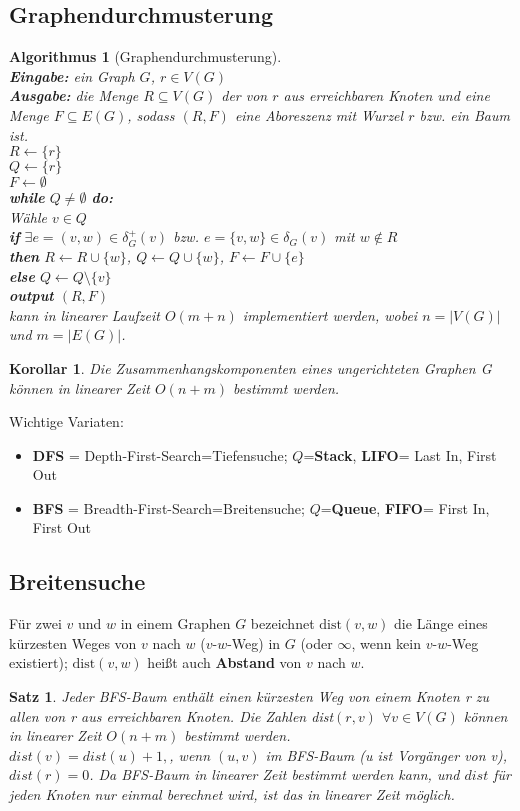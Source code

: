 \documentclass[12pt,a4paper]{article}
\theoremstyle{plain}
\newtheorem{Satz}[Theorem]{Satz}
\newtheorem{Korollar}[Theorem]{Korollar}
\newtheorem{Algorithmus}[Theorem]{Algorithmus}
\numberwithin{equation}{section}
\begin{document}
\subsection{Graphendurchmusterung}
\begin{Algorithmus}[Graphendurchmusterung]\\
\textbf{Eingabe:} ein Graph $G$, $r\in V(G)$\\
\textbf{Ausgabe:} die Menge $R\subseteq V(G)$ der von $r$ aus erreichbaren Knoten und eine Menge $F\subseteq E(G)$, sodass $(R,F)$ eine Aboreszenz mit Wurzel $r$ bzw. ein Baum ist.\\
$R\leftarrow \{r\}$\\
$Q\leftarrow \{r\}$\\
$F\leftarrow \emptyset$\\
\textbf{while} $Q \neq \emptyset$ \textbf{do:}\\
\text{\qquad} Wähle $v\in Q$\\
\text{\qquad} \textbf{if} $\exists e=(v,w)\in \delta^+_G(v)$ bzw. $e=\{v,w\}\in \delta_G(v)$ mit $w \not\in R$\\
\text{\qquad} \textbf{then} $R\leftarrow R\cup \{w\}$, $Q\leftarrow Q\cup \{w\}$, $F\leftarrow F\cup\{e\}$\\
\text{\qquad} \textbf{else} $Q\leftarrow Q\setminus\{v\}$\\
\textbf{output} $(R,F)$\\
kann in linearer Laufzeit $O(m+n)$ implementiert werden, wobei $n=|V(G)|$ und $m=|E(G)|$. 
\end{Algorithmus}
\begin{Korollar}
Die Zusammenhangskomponenten eines ungerichteten Graphen G können in linearer Zeit $O(n+m)$ bestimmt werden.
\end{Korollar}
Wichtige Variaten:
\begin{itemize}
\item \textbf{DFS} = Depth-First-Search=Tiefensuche; $Q$=\textbf{Stack}, \textbf{LIFO}= Last In, First Out
\item \textbf{BFS} = Breadth-First-Search=Breitensuche; $Q$=\textbf{Queue}, \textbf{FIFO}= First In, First Out
\end{itemize}
\subsection{Breitensuche}
Für zwei $v$ und $w$ in einem Graphen $G$ bezeichnet $\text{dist}(v,w)$ die Länge eines kürzesten Weges von $v$ nach $w$ ($v$-$w$-Weg) in $G$ (oder $\infty$, wenn kein $v$-$w$-Weg existiert); $\text{dist}(v,w)$ heißt auch \textbf{Abstand} von $v$ nach $w$.
\begin{Satz}
Jeder BFS-Baum enthält einen kürzesten Weg von einem Knoten r zu allen von r aus erreichbaren Knoten. Die Zahlen \emph{dist}$(r,v)$ $\forall v\in V(G)$ können in linearer Zeit $O(n+m)$ bestimmt werden.\\
$dist(v)=dist(u)+1,$, wenn $(u,v)$ im BFS-Baum (u ist Vorgänger von v), $dist(r)=0$. Da BFS-Baum in linearer Zeit bestimmt werden kann, und $dist$ für jeden Knoten nur einmal berechnet wird, ist das in linearer Zeit möglich.
\end{Satz}
\end{document}
